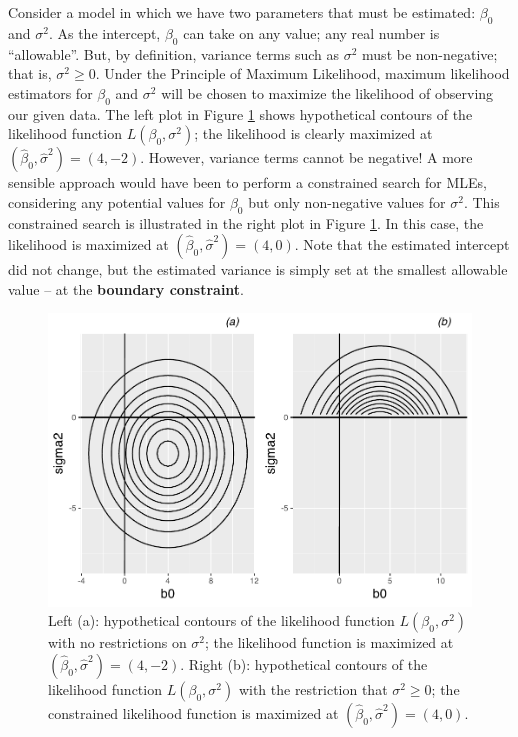\documentclass[
]{krantz}
\begin{document}
Consider a model in which we have two parameters that must be estimated: \(\beta_0\) and \(\sigma^2\). As the intercept, \(\beta_0\) can take on any value; any real number is ``allowable''. But, by definition, variance terms such as \(\sigma^2\) must be non-negative; that is, \(\sigma^2 \geq 0\). Under the Principle of Maximum Likelihood, maximum likelihood estimators for \(\beta_0\) and \(\sigma^2\) will be chosen to maximize the likelihood of observing our given data. The left plot in Figure \ref{fig:boundary} shows hypothetical contours of the likelihood function \(L(\beta_0, \sigma^2)\); the likelihood is clearly maximized at \((\hat{\beta}_0 , \hat{\sigma}^2)=(4,-2)\). However, variance terms cannot be negative! A more sensible approach would have been to perform a constrained search for MLEs, considering any potential values for \(\beta_0\) but only non-negative values for \(\sigma^2\). This constrained search is illustrated in the right plot in Figure \ref{fig:boundary}. In this case, the likelihood is maximized at \((\hat{\beta}_0 , \hat{\sigma}^2)=(4,0)\). Note that the estimated intercept did not change, but the estimated variance is simply set at the smallest allowable value -- at the \textbf{boundary constraint}.



\begin{figure}

{\centering \includegraphics[width=0.6\linewidth]{bookdown-BeyondMLR_files/figure-latex/boundary-1} 

}

\caption{Left (a): hypothetical contours of the likelihood function \(L(\beta_0, \sigma^2)\) with no restrictions on \(\sigma^2\); the likelihood function is maximized at \((\hat{\beta}_0, \hat{\sigma}^2)=(4,-2)\). Right (b): hypothetical contours of the likelihood function \(L(\beta_0, \sigma^2)\) with the restriction that \(\sigma^2 \geq 0\); the constrained likelihood function is maximized at \((\hat{\beta}_0, \hat{\sigma}^2)=(4,0)\).}\label{fig:boundary}
\end{figure}
\end{document}

